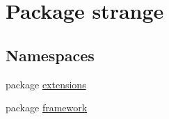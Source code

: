 \hypertarget{namespacestrange}{\section{Package strange}
\label{namespacestrange}
}
\subsection*{Namespaces}
\begin{DoxyCompactItemize}
\item 
package \hyperlink{namespacestrange_1_1extensions}{extensions}
\item 
package \hyperlink{namespacestrange_1_1framework}{framework}
\end{DoxyCompactItemize}
